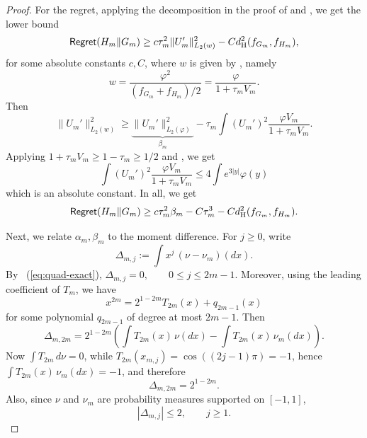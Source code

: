 \documentclass[letterpaper,11pt]{article}
\newcommand{\eqref}[1]{~(\ref{#1})}
\newcommand{\hellinger}{d_{\rm H}}
\theoremstyle{definition}
\newcommand{\Regret}{\mathsf{Regret}}
\begin{document}
\begin{proof}
For the regret, applying the decomposition  in the proof of
 and , we get the lower bound
\[
\Regret(H_m\|G_m)
\geq c \tau_m^2 \|U_m'\|_{L_2(w)}^2
-C \hellinger^2(f_{G_m},f_{H_m}),
\]
for some absolute constants $c,C$, where $w$ is given by , namely
\[
w = \frac{\varphi^2}{(f_{G_m}+f_{H_m})/2}
= \frac{\varphi}{1+\tau_m V_m}.
\]
Then
\[
 \|U_m'\|_{L_2(w)}^2
 \geq  \underbrace{\|U_m'\|_{L_2(\varphi)}^2}_{\beta_m}
 -  \tau_m \int (U_m')^2 \frac{\varphi V_m}{1+\tau_m V_m}.
\]
Applying $1+\tau_m V_m\geq 1-\tau_m \geq 1/2$ and ,
we get
\[
\int (U_m')^2 \frac{\varphi V_m}{1+\tau_m V_m}
\leq 4 \int e^{3|y|} \varphi(y)
\]
which is an absolute constant.
In all, we get
\begin{equation}
\Regret(H_m\|G_m) \geq c\tau_m^2 \beta_m - C \tau_m^3 - C \hellinger^2(f_{G_m},f_{H_m}).
    \label{eq:reg-lower}
\end{equation}


Next, we relate $\alpha_m,\beta_m$ to the moment difference. For $j\ge 0$, write
  \[
    \Delta_{m,j}:=\int x^j\,(\nu-\nu_m)(dx).
  \]
  By \eqref{eq:quad-exact}, $
    \Delta_{m,j}=0,\qquad 0\le j\le 2m-1$.
  Moreover, using the leading coefficient of $T_m$, we have
  \[
    x^{2m}=2^{1-2m}T_{2m}(x)+q_{2m-1}(x)
  \]
  for some polynomial $q_{2m-1}$ of degree at most $2m-1$. Then
  \[
    \Delta_{m,2m}
    =
    2^{1-2m}
    \left(
      \int T_{2m}(x)\,\nu(dx)-\int T_{2m}(x)\,\nu_m(dx)
    \right).
  \]
  Now $\int T_{2m}\,d\nu=0$, while $T_{2m}(x_{m,j})=\cos((2j-1)\pi)=-1$, hence $
    \int T_{2m}(x)\,\nu_m(dx)=-1$,
  and therefore
  \begin{equation}
    \Delta_{m,2m}=2^{1-2m}.
    \label{eq:first-gap}
  \end{equation}
  Also, since $\nu$ and $\nu_m$ are probability measures supported on $[-1,1]$,
  \begin{equation}
    |\Delta_{m,j}|\le 2,\qquad j\ge 1.
    \label{eq:moment-bound}
  \end{equation}




\end{proof}
\end{document}
